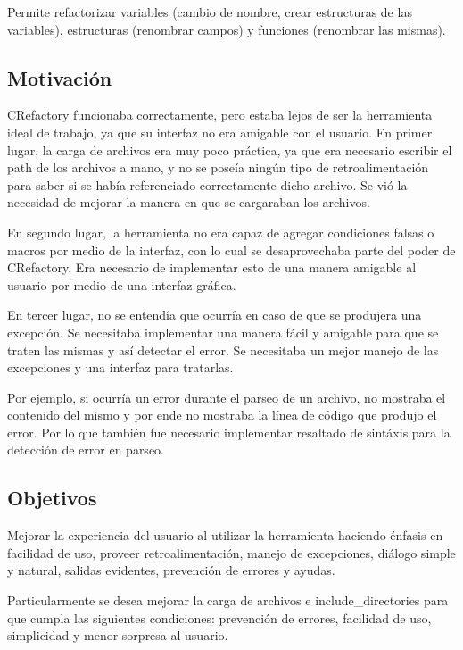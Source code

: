 \documentclass[a4paper,oneside,12pt]{article}
\begin{document}
Permite refactorizar variables (cambio de nombre, crear estructuras de las variables), estructuras (renombrar campos) y funciones (renombrar las mismas).

\subsection{Motivaci\'on}
CRefactory funcionaba correctamente, pero estaba lejos de ser la herramienta ideal de trabajo, ya que su interfaz no era amigable con el usuario. En primer lugar, la carga de archivos era muy poco pr\'actica, ya que era necesario escribir el path de los archivos a mano, y no se pose\'ia ning\'un tipo de retroalimentaci\'on para saber si se hab\'ia referenciado correctamente dicho archivo. Se vi\'o la necesidad de mejorar la manera en que se cargaraban los archivos.

En segundo lugar, la herramienta no era capaz de agregar condiciones falsas o macros por medio de la interfaz, con lo cual se desaprovechaba  parte del poder de CRefactory. Era necesario de implementar esto de una manera amigable al usuario por medio de una interfaz gr\'afica.

En tercer lugar, no se entend\'ia que ocurr\'ia en caso de que se produjera una excepci\'on. Se necesitaba implementar una manera f\'acil y amigable para que se traten las mismas y as\'i detectar el error. Se necesitaba un mejor manejo de las excepciones y una interfaz para tratarlas.

Por ejemplo, si ocurr\'ia un error durante el parseo de un archivo, no mostraba el contenido del mismo y por ende no mostraba la l\'inea de c\'odigo que produjo el error. Por lo que tambi\'en fue necesario implementar resaltado de sint\'axis para la detecci\'on de error en parseo.


\subsection{Objetivos}

Mejorar la experiencia del usuario al utilizar la herramienta haciendo \'enfasis en facilidad de uso, proveer retroalimentaci\'on, manejo de excepciones, di\'alogo simple y natural, salidas evidentes, prevenci\'on de errores y ayudas.

Particularmente se desea mejorar la carga de archivos e include\_directories para que cumpla las siguientes condiciones: prevenci\'on de errores, facilidad de uso, simplicidad y menor sorpresa al usuario.
\end{document}
